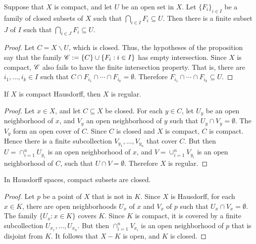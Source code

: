\begin{prop} Suppose that $X$ is compact, and let $U$ be an open set
  in $X$.  Let $\{ F_i\}_{i\in I}$ be a family of closed subsets of
  $X$ such that $\bigcap _{i\in I}F_i\subseteq U$.  Then there is a
  finite subset $J$ of $I$ such that $\bigcap _{i\in J}F_i\subseteq
  U$. \label{fin-down} \end{prop}

\begin{proof} Let $C=X\backslash U$, which is closed.  Thus, the
  hypotheses of the proposition say that the family $\mathscr C :=\{ C\}\cup
  \{ F_i:i\in I\}$ has empty intersection.  Since $X$ is compact,
  $\mathscr C$ also fails to have the finite intersection property.  That is,
  there are $i_1,\dots ,i_k\in I$ such that $C\cap
  F_{i_1}\cap\cdots\cap F_{i_k}=\emptyset$.  Therefore
  $F_{i_1}\cap\cdots\cap F_{i_k}\subseteq U$. \end{proof}


\begin{prop} If $X$ is compact Hausdorff, then $X$ is
  regular. \label{chaus-regular} \end{prop}

\begin{proof} Let $x\in X$, and let $C\subseteq X$ be closed.  For
  each $y\in C$, let $U_y$ be an open neighborhood of $x$, and $V_y$
  an open neighborhood of $y$ such that $U_y\cap V_y=\emptyset$.  The
  $V_y$ form an open cover of $C$.  Since $C$ is closed and $X$ is
  compact, $C$ is compact.  Hence there is a finite subcollection
  $V_{y_1},\dots ,V_{y_n}$ that cover $C$.  But then $U=\cap
  _{i=1}^nU_{y_i}$ is an open neighborhood of $x$, and $V=\cup
  _{i=1}^nV_{y_i}$ is an open neighborhood of $C$, such that $U\cap
  V=\emptyset$.  Therefore $X$ is regular. \end{proof}



\begin{prop} In Hausdorff spaces, compact subsets are
  closed. \label{haus-cc} \end{prop}

\begin{proof} Let $p$ be a point of $X$ that is not in $K$.  Since $X$
  is Hausdorff, for each $x\in K$, there are open neighborhoods $U_x$
  of $x$ and $V_x$ of $p$ such that $U_x\cap V_x=\emptyset$.  The
  family $\{ U_x:x\in K\}$ covers $K$.  Since $K$ is compact, it is
  covered by a finite subcollection $U_{x_1},\dots ,U_{x_n}$.  But
  then $\cap _{i=1}^nV_{x_i}$ is an open neighborhood of $p$ that is
  disjoint from $K$.  It follows that $X-K$ is open, and $K$ is
  closed. \end{proof}


